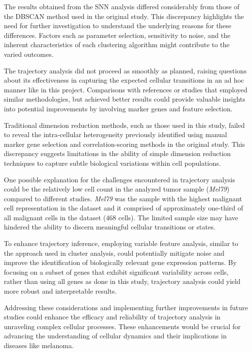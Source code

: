 \documentclass[11pt]{article}
\begin{document}
\begin{multicols}{2}
    The results obtained from the SNN analysis differed considerably from those of the DBSCAN method used in the original study. This discrepancy highlights the need for further investigation to understand the underlying reasons for these differences. Factors such as parameter selection, sensitivity to noise, and the inherent characteristics of each clustering algorithm might contribute to the varied outcomes.

    The trajectory analysis did not proceed as smoothly as planned, raising questions about its effectiveness in capturing the expected cellular transitions in an ad hoc manner like in this project. Comparisons with references or studies that employed similar methodologies, but achieved better results could provide valuable insights into potential improvements\cite{liu_single_2024} by involving marker genes and feature selection.
    
    Traditional dimension reduction methods, such as those used in this study, failed to reveal the intra-cellular heterogeneity previously identified using manual marker gene selection and correlation-scoring methods in the original study. This discrepancy suggests limitations in the ability of simple dimension reduction techniques to capture subtle biological variations within cell populations.
    
    One possible explanation for the challenges encountered in trajectory analysis could be the relatively low cell count in the analyzed tumor sample (\textit{Mel79}) compared to different studies\cite{he_single-cell_2021}. \textit{Mel79} was the sample with the highest malignant cell representation in the dataset and it comprised of approximately one-third of all malignant cells in the dataset (468 cells). The limited sample size may have hindered the ability to discern meaningful cellular transitions or states.
    
    To enhance trajectory inference, employing variable feature analysis, similar to the approach used in cluster analysis, could potentially mitigate noise and improve the identification of biologically relevant gene expression patterns. By focusing on a subset of genes that exhibit significant variability across cells, rather than using all genes as done in this study, trajectory analysis could yield more robust and interpretable results.
    
    Addressing these considerations and implementing further improvements in future studies could enhance the efficacy and reliability of trajectory analysis in unraveling complex cellular processes. These enhancements would be crucial for advancing the understanding of cellular dynamics and their implications in diseases like melanoma.
    
    \end{multicols}

\newpage

\end{document}
